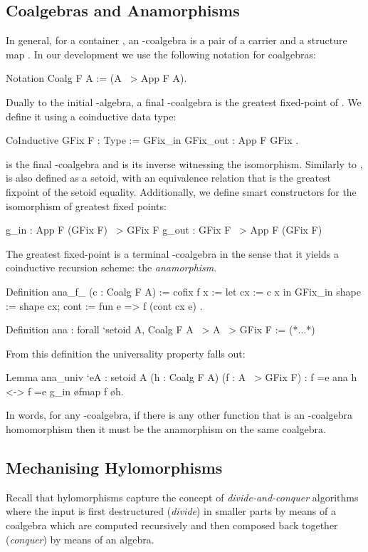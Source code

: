 \documentclass[a4paper,anonymous, UKenglish,cleveref, autoref, thm-restate]{lipics-v2021}
\begin{document}
\subsection{Coalgebras and Anamorphisms}
\label{sec:coq-coalg}

In general, for a container , an -coalgebra is a pair of a carrier
 and a structure map .  In our development we use the
following notation for coalgebras:
\begin{coqcode}
Notation Coalg F A := (A ~> App F A).
\end{coqcode}
Dually to the initial -algebra, a final -coalgebra is the greatest
fixed-point of . We define it using a coinductive data type:
\begin{coqcode}
CoInductive GFix F : Type := GFix_in { GFix_out : App F GFix }.
\end{coqcode}
 is the final -coalgebra and  is its
inverse witnessing the isomorphism. Similarly to ,  is also
defined as a setoid, with an equivalence relation that is the greatest fixpoint
of the  setoid equality. Additionally, we define smart constructors
for the isomorphism of greatest fixed points:
\begin{coqcode}
g_in : App F (GFix F) ~> GFix F          g_out : GFix F ~> App F (GFix F)
\end{coqcode}
The greatest fixed-point is a terminal -coalgebra in the sense that it
yields a coinductive recursion scheme: the \emph{anamorphism}.
\begin{coqcode}
Definition ana_f_ (c : Coalg F A) :=
  cofix f x := let cx := c x in
   GFix_in { shape := shape cx; cont := fun e => f (cont cx e) }.

Definition ana : forall `{setoid A}, Coalg F A ~> A ~> GFix F := (*...*)
\end{coqcode}
From this definition the universality property falls out:
\begin{coqcode}
Lemma ana_univ `{eA : setoid A} (h : Coalg F A) (f : A ~> GFix F)
: f =e ana h <-> f =e g_in \o fmap f \o h.
\end{coqcode}
In words, for any -coalgebra, if there is any other function  that
is an -coalgebra homomorphism then it must be the anamorphism on the same
coalgebra.

\subsection{Mechanising Hylomorphisms}
\label{sec:coq-rec-coalgebras}
Recall that hylomorphisms capture the concept of \emph{divide-and-conquer}
algorithms where the input is first destructured (\emph{divide}) in smaller
parts by means of a coalgebra which are computed recursively and then composed
back together (\emph{conquer}) by means of an algebra.
\end{document}
